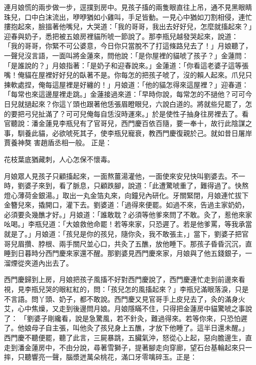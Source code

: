 \begin{showcontents}{}
連月娘慌的兩步做一步，逕撲到房中。見孩子搐的兩隻眼直往上吊，通不見黑眼睛珠兒，口中白沫流出，咿咿猶如小雞叫，手足皆動。一見心中猶如刀割相侵，連忙摟抱起來，臉搵著他嘴兒，大哭道：「我的哥哥，我出去好好兒，怎麼就搐起來？」迎春與奶子，悉把被五娘房裡貓所唬一節說了。那李瓶兒越發哭起來，說道： 「我的哥哥，你緊不可公婆意，今日你只當脫不了打這條路兒去了！」月娘聽了，一聲兒沒言語，一面叫將金蓮來，問他說：「是你屋裡的貓唬了孩子？」金蓮問： 「是誰說的？」月娘指著：「是奶子和迎春說來。」金蓮道：「你看這老婆子這等張嘴！俺貓在屋裡好好兒的臥著不是。你每怎的把孩子唬了，沒的賴人起來。爪兒只揀軟處捏，俺每這屋裡是好纏的！」月娘道：「他的貓怎得來這屋裡？」迎春道：「每常也來這邊屋裡走跳。」金蓮接過來道：「早時你說，每常怎的不撾他？可可今日兒就撾起來？你這丫頭也跟著他恁張眉瞪眼兒，六說白道的。將就些兒罷了，怎的要把弓兒扯滿了？可可兒俺每自恁沒時運來。」於是使性子抽身往房裡去了。看官聽說：潘金蓮見李瓶兒有了官哥兒，西門慶百依百隨，要一奉十，故行此陰謀之事，馴養此貓，必欲唬死其子，使李瓶兒寵衰，教西門慶復親於己。就如昔日屠岸賈養神獒
害趙盾丞相一般。
正是：

花枝葉底猶藏刺，人心怎保不懷毒。

月娘眾人見孩子只顧搐起來，一面熬薑湯灌他，一面使來安兒快叫劉婆去。不一時，劉婆子來到，看了脈息，只顧跌腳，說道：「此遭驚唬重了，難得過了。快熬燈心薄荷金銀湯。」取出一丸金箔丸來，向鐘兒內研化。牙關緊閉，月娘連忙拔下金簪兒來，撬開口，灌下去。劉婆道：「過得來便罷。如過不來，告過主家奶奶，必須要灸幾醮才好。」月娘道：「誰敢耽？必須等他爹來問了不敢。灸了，惹他來家吆喝。」李瓶兒道：「大娘救他命罷！若等來家，只恐遲了。若是他爹罵，等我承當就是了。」月娘道：「孩兒是你的孩兒，隨你灸，我不敢張主，」當下，劉婆子把官哥兒眉攢、脖根、兩手關尺並心口，共灸了五醮，放他睡下。那孩子昏昏沉沉，直睡到日暮時分西門慶來家還不醒。那劉婆見西門慶來家，月娘與了他五錢銀子，一溜煙從夾道內出去了。


西門慶歸到上房，月娘把孩子風搐不好對西門慶說了，西門慶連忙走到前邊來看視，見李瓶兒哭的眼紅紅的，問：「孩兒怎的風搐起來？」李瓶兒滿眼落淚，只是不言語。問丫頭、奶子，都不敢說。西門慶又見官哥手上皮兒去了，灸的滿身火艾，心中焦燥，又走到後邊問月娘。月娘隱瞞不住，只得把金蓮房中貓驚唬之事說了： 「劉婆子剛纔看，說是急驚風，若不針灸，難過得來。若等你來，只恐怕遲了。他娘母子自主張，叫他灸了孩兒身上五醮，才放下他睡了。這半日還未醒。」西門慶不聽便罷，聽了此言，三屍暴跳，五臟氣沖，怒從心上起，惡向膽邊生，直走到潘金蓮房中，不由分說，尋著雪獅子，提著腳走向穿廊，望石台基輪起來只一摔，只聽響亮一聲，腦漿迸萬朵桃花，滿口牙零噙碎玉。正是：


\end{showcontents}

